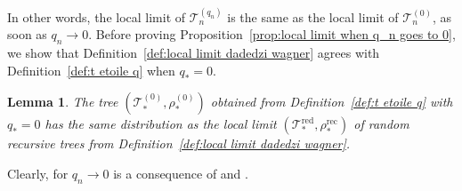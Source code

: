 \documentclass{article}
\newtheorem{lemma}[theorem]{Lemma}
\theoremstyle{remark}
\newcommand{\cT}{\mathcal{T}}
\newcommand{\red}{\mathrm{red}}
\newcommand{\rec}{\mathrm{rec}}
\begin{document}
In other words, the local limit of $\cT_n^{(q_n)}$ is the same as the local limit of $\cT_n^{(0)}$, as soon as $q_n \rightarrow 0$.
Before proving Proposition~\ref{prop:local limit when q_n goes to 0}, we show that Definition~\ref{def:local limit dadedzi wagner} agrees with Definition~\ref{def:t etoile q} when $q_*=0$.

\begin{lemma}
\label{lem:definitions of local limits agree}
The tree $(\cT_*^{(0)},\rho_*^{(0)})$ obtained from Definition~\ref{def:t etoile q} with $q_*=0$ has the same distribution as the local limit $(\cT_*^\red, \rho_*^\rec)$ of random recursive trees from Definition~\ref{def:local limit dadedzi wagner}.
\end{lemma}

Clearly,  for $q_n \rightarrow 0$ is a consequence of  and .
\end{document}
